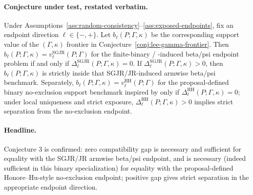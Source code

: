 \paragraph{Conjecture under test, restated verbatim.}
Under Assumptions~\ref{ass:random-consistency}--\ref{ass:exposed-endpoints}, fix an endpoint direction \(\ell\in\{-,+\}\).  Let \(b_\ell(P;\Gamma,\kappa)\) be the corresponding support value of the \((\Gamma,\kappa)\) frontier in Conjecture~\ref{conj:lee-gamma-frontier}.  Then \(b_\ell(P;\Gamma,\kappa)=v_\ell^{\mathrm{SGJR}}(P;\Gamma)\) for the finite-binary \citet{ShepherdGilbertJemiaiRotnitzky2006} / \citet{JemiaiRotnitzkyShepherdGilbert2007}-induced beta/psi endpoint problem if and only if \(\Delta_\ell^{\mathrm{SGJR}}(P;\Gamma,\kappa)=0\).  If \(\Delta_\ell^{\mathrm{SGJR}}(P;\Gamma,\kappa)>0\), then \(b_\ell(P;\Gamma,\kappa)\) is strictly inside that SGJR/JR-induced armwise beta/psi benchmark.  Separately, \(b_\ell(P;\Gamma,\kappa)=v_\ell^{\mathrm{HH}}(P;\Gamma)\) for the proposal-defined binary no-exclusion support benchmark inspired by \citet{HonoreHu2020Selection} only if \(\Delta_\ell^{\mathrm{HH}}(P;\Gamma,\kappa)=0\); under local uniqueness and strict exposure, \(\Delta_\ell^{\mathrm{HH}}(P;\Gamma,\kappa)>0\) implies strict separation from the no-exclusion endpoint.

\paragraph{Headline.}
Conjecture 3 is confirmed: zero compatibility gap is necessary and sufficient for equality with the SGJR/JR armwise beta/psi endpoint, and is necessary (indeed sufficient in this binary specialization) for equality with the proposal-defined Honore--Hu-style no-exclusion endpoint; positive gap gives strict separation in the appropriate endpoint direction.

